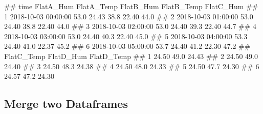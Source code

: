 \documentclass[
  a4paperpaper,
]{book}
\let\oldverbatim\verbatim
\let\endoldverbatim\endverbatim
\renewenvironment{verbatim}{\footnotesize\oldverbatim}{\endoldverbatim}
\begin{document}
\begin{verbatim}
##                  time FlatA_Hum FlatA_Temp FlatB_Hum FlatB_Temp FlatC_Hum
## 1 2018-10-03 00:00:00      53.0      24.43      38.8      22.40      44.0
## 2 2018-10-03 01:00:00      53.0      24.40      38.8      22.40      44.0
## 3 2018-10-03 02:00:00      53.0      24.40      39.3      22.40      44.7
## 4 2018-10-03 03:00:00      53.0      24.40      40.3      22.40      45.0
## 5 2018-10-03 04:00:00      53.3      24.40      41.0      22.37      45.2
## 6 2018-10-03 05:00:00      53.7      24.40      41.2      22.30      47.2
##   FlatC_Temp FlatD_Hum FlatD_Temp
## 1      24.50      49.0      24.43
## 2      24.50      49.0      24.40
## 3      24.50      48.3      24.38
## 4      24.50      48.0      24.33
## 5      24.50      47.7      24.30
## 6      24.57      47.2      24.30
\end{verbatim}

\newpage

\hypertarget{DATAWRANGLING-MERGE-TWO-DATAFRAMES}{%
\subsection{Merge two Dataframes}\label{DATAWRANGLING-MERGE-TWO-DATAFRAMES}}
\end{document}
